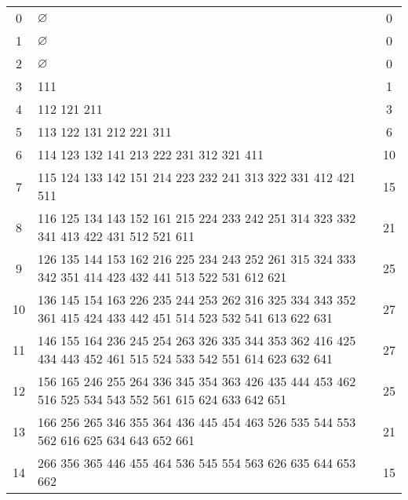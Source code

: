 \begin{enumerate}
\begin{sol}
\begin{center}
\begin{tabular}{c|l|c}
              0   & $\varnothing$                                                                                               & 0     \\
              1   & $\varnothing$                                                                                               & 0     \\
              2   & $\varnothing$                                                                                               & 0     \\
              3   & 111                                                                                                         & 1     \\
              4   & 112 121 211                                                                                                 & 3     \\
              5   & 113 122 131 212 221 311                                                                                     & 6     \\
              6   & 114 123 132 141 213 222 231 312 321 411                                                                     & 10    \\
              7   & 115 124 133 142 151 214 223 232 241 313 322 331 412 421 511                                                 & 15    \\
              8   & 116 125 134 143 152 161 215 224 233 242 251 314 323 332 341 413 422 431 512 521 611                         & 21    \\
              9   & 126 135 144 153 162 216 225 234 243 252 261 315 324 333 342 351 414 423 432 441 513 522 531 612 621         & 25    \\
              10  & 136 145 154 163 226 235 244 253 262 316 325 334 343 352 361 415 424 433 442 451 514 523 532 541 613 622 631 & 27    \\
              11  & 146 155 164 236 245 254 263 326 335 344 353 362 416 425 434 443 452 461 515 524 533 542 551 614 623 632 641 & 27    \\
              12  & 156 165 246 255 264 336 345 354 363 426 435 444 453 462 516 525 534 543 552 561 615 624 633 642 651         & 25    \\
              13  & 166 256 265 346 355 364 436 445 454 463 526 535 544 553 562 616 625 634 643 652 661                         & 21    \\
              14  & 266 356 365 446 455 464 536 545 554 563 626 635 644 653 662                                                 & 15    \\

\end{tabular}
\end{center}
\end{sol}
\end{enumerate}
